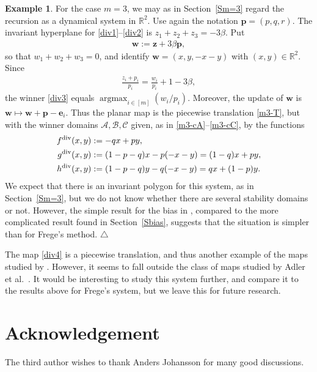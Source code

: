 \documentclass[11pt,reqno,tbtags,a4paper]{amsart}
\numberwithin{equation}{section}
\theoremstyle{plain}%
\theoremstyle{definition}
\newcommand\xqed[1]{%
    \leavevmode\unskip\penalty9999 \hbox{}\nobreak\hfill
    \quad\hbox{#1}}
\newtheorem{exampleqqq}[theorem]{Example}
\newenvironment{example}{\begin{exampleqqq}}
  {\xqed{$\triangle$}\end{exampleqqq}}
\theoremstyle{remark}
\newcommand{\refS}[1]{Section~\ref{#1}}
\newcommand\bbR{\mathbb R}
\newcommand\argmax{\operatorname{argmax}}
\newcommand\cA{\mathcal A}
\newcommand\cB{\mathcal B}
\newcommand\cC{\mathcal C}
\newcommand\ve{\mathbf{e}}
\newcommand\vp{\mathbf{p}}
\newcommand\vw{\mathbf{w}}
\newcommand\vz{\mathbf{z}}
\newcommand\0{{\boldsymbol 0}}
\newcommand\1{{\boldsymbol 1}}
\begin{document}
\begin{example}
For the case $m=3$, we may as in \refS{Sm=3}
regard the recursion as a dynamical system in $\bbR^2$.
Use again the notation $\vp=(p,q,r)$. The invariant hyperplane for
\eqref{div1}--\eqref{div2} is $z_1+z_2+z_3=-3\beta$. Put
\begin{align}
\vw:=\vz+3\beta\vp,
\end{align}
so that $w_1+w_2+w_3=0$, and identify
$\vw=(x,y,-x-y)$ with $(x,y)\in\bbR^2$. Since
\begin{align}
\frac{z_i+p_i}{p_i}=\frac{w_i}{p_i}+1-3\beta,
\end{align}
the winner \eqref{div3} equals $\argmax_{i\in[m]} (w_i/p_i)$. 
Moreover, the update of $\vw$ is
$\vw\mapsto\vw+\vp-\ve_i$. Thus the planar map is the piecewise
translation \eqref{m3-T}, but with the winner domains
$\cA,\cB,\cC$ given, as in \eqref{m3-cA}--\eqref{m3-cC}, by the functions
\begin{align}
 f^{\rm div}(x,y)&:=-qx+py,\\
 g^{\rm div}(x,y)&:=(1-p-q)x-p(-x-y)=(1-q)x+py,\\
 h^{\rm div}(x,y)&:=(1-p-q)y-q(-x-y)=qx+(1-p)y.
\end{align}
We expect that there is an invariant polygon for this system, as in
\refS{Sm=3},
but we do not know whether there are several stability domains or not.
However, the simple result for the bias in \cite{SJ262}, 
compared to the more complicated result found in
\refS{Sbias},
suggests that the situation is simpler than for Frege's method.
\end{example}

The map \eqref{div4} is a piecewise translation, and thus another example of
the maps studied by \citet{gun}. However, it seems to
fall outside the class of maps studied by Adler et al.\
\cite{adler0,adler10,adler17,adler18}.
It would be interesting to study this system 
further, and compare it to the results above for Frege's system,
but we leave this for future research.

\section*{Acknowledgement}

The third author wishes to thank Anders Johansson for many good discussions.


\newcommand\AAP{\emph{Adv. Appl. Probab.} }
\newcommand\JAP{\emph{J. Appl. Probab.} }
\newcommand\JAMS{\emph{J. \AMS} }
\newcommand\MAMS{\emph{Memoirs \AMS} }
\newcommand\PAMS{\emph{Proc. \AMS} }
\newcommand\TAMS{\emph{Trans. \AMS} }
\newcommand\AnnMS{\emph{Ann. Math. Statist.} }
\newcommand\AnnPr{\emph{Ann. Probab.} }
\newcommand\CPC{\emph{Combin. Probab. Comput.} }
\newcommand\JMAA{\emph{J. Math. Anal. Appl.} }
\newcommand\RSA{\emph{Random Structures Algorithms} }
%
%
\newcommand\DMTCS{\jour{Discr. Math. Theor. Comput. Sci.} }
\end{document}
